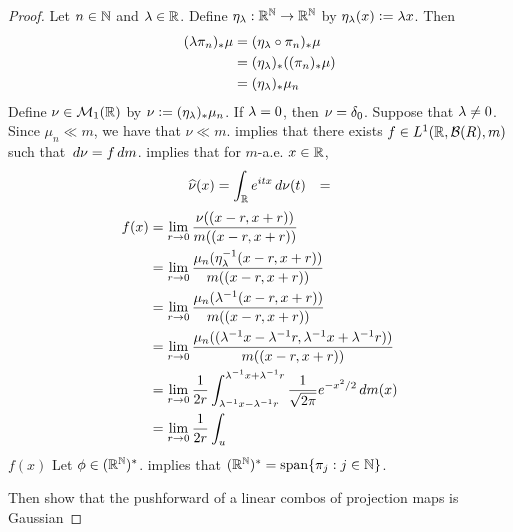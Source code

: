 \documentclass{book}
\begin{document}
	\begin{proof}
	Let $n \in \mathbb{N}$ and $\lambda \in \mathbb{R}$. Define $\eta_{\lambda}: \mathbb{R}^{\mathbb{N}} \rightarrow \mathbb{R}^{\mathbb{N}}$ by $\eta_{\lambda}(x) \vcentcolon= \lambda x$. Then 
	\begin{align*}
		(\lambda \pi_n)_*\mu
		& = (\eta_{\lambda} \circ \pi_n)_*\mu \\
		& = (\eta_{\lambda})_*((\pi_n)_* \mu) \\
		& = (\eta_{\lambda})_*\mu_n
	\end{align*} 
		Define $\nu \in \mathcal{M}_1(\mathbb{R})$ by $\nu \vcentcolon= (\eta_{\lambda})_*\mu_n$. If $\lambda = 0$, then $\nu = \delta_0$. Suppose that $\lambda \neq 0$. Since $\mu_n \ll m$,  we have that $\nu \ll m$.  implies that there exists $f \in L^1(\mathbb{R}, \mathcal{B}(R), m)$ such that $\, d \nu = f \, d m$.  implies that for $m$-a.e. $x \in \mathbb{R}$, 
		\begin{align*}
			\widehat{\nu}(x)
			& = \int_{\mathbb{R}} e^{itx} \, d \nu(t)
			& = 
		\end{align*}
		\begin{align*}
			f(x) 
			& = \lim_{r \rightarrow 0} \frac{\nu((x-r, x+r))}{m((x-r, x+ r))} \\
			& = \lim_{r \rightarrow 0} \frac{\mu_n(\eta_{\lambda}^{-1}(x-r, x+r))}{m((x-r, x+ r))} \\
			& = \lim_{r \rightarrow 0} \frac{\mu_n(\lambda^{-1}(x-r, x+r))}{m((x-r, x+ r))} \\
			& = \lim_{r \rightarrow 0} \frac{\mu_n((\lambda^{-1}x-\lambda^{-1}r, \lambda^{-1}x+\lambda^{-1}r))}{m((x-r, x+ r))} \\
			& = \lim_{r \rightarrow 0} \frac{1}{2r} \int_{\lambda^{-1}x-\lambda^{-1}r}^{\lambda^{-1}x + \lambda^{-1}r} \frac{1}{\sqrt{2 \pi}}e^{- x^2/2} \, d m(x) \\
			& = \lim_{r \rightarrow 0} \frac{1}{2r} \int_{u}
		\end{align*}
		$f(x)$
		Let $\phi \in (\mathbb{R}^{\mathbb{N}})^*$.  implies that $(\mathbb{R}^{\mathbb{N}})^* = \operatorname{span}\{\pi_j:j \in \mathbb{N}\}$. 
		
		
		 Then show that the pushforward of a linear combos of projection maps is Gaussian
	\end{proof}
	
	
	
	
	
	
	
	
	
	
	
\end{document}

